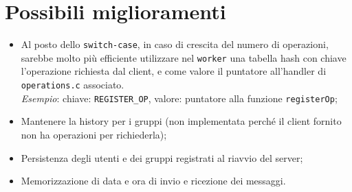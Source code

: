 \documentclass{article}
\begin{document}
\section{Possibili miglioramenti}
\begin{itemize}
	\item Al posto dello \texttt{switch-case}, in caso di crescita del numero di operazioni, sarebbe molto più efficiente utilizzare nel \texttt{worker} una tabella hash con chiave l'operazione richiesta dal client, e come valore il puntatore all'handler di \texttt{operations.c} associato.\\
	\textit{Esempio}: chiave: \texttt{REGISTER\_OP}, valore: puntatore alla funzione \texttt{registerOp};
	\item Mantenere la history per i gruppi (non implementata perché il client fornito non ha operazioni per richiederla);
	\item Persistenza degli utenti e dei gruppi registrati al riavvio del server;
	\item Memorizzazione di data e ora di invio e ricezione dei messaggi.
\end{itemize}
\end{document}
